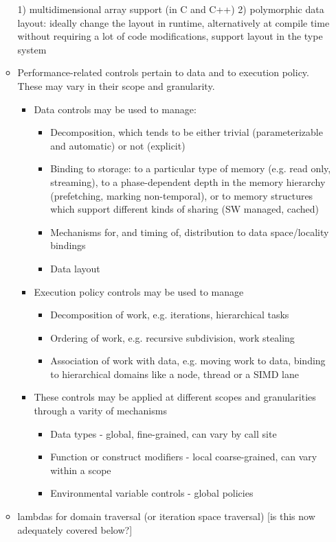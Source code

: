 \begin{itemize}
\begin{itemize}
    1) multidimensional array support (in C and C++) 
    2) polymorphic data layout: 
    ideally change the layout in runtime, 
    alternatively at compile time without requiring a lot of code modifications, 
    support layout in the type system 
  \item Performance-related controls pertain to data and to execution policy.  These may vary in their scope and granularity.
  \begin{itemize}
  \item Data controls may be used to manage:
  \begin{itemize} 
  \item Decomposition, which tends to be either trivial (parameterizable and automatic) or not (explicit)
  \item Binding to storage: to a particular type of memory (e.g. read only, streaming), to a phase-dependent depth in the memory hierarchy (prefetching, marking non-temporal), or to memory structures which support different kinds of sharing (SW managed, cached)
  \item Mechanisms for, and timing of, distribution to data space/locality bindings
  \item Data layout
  \end{itemize}
  \item Execution policy controls may be used to manage
  \begin{itemize} 
  \item Decomposition of work, e.g. iterations, hierarchical tasks
  \item Ordering of work, e.g. recursive subdivision, work stealing
  \item Association of work with data, e.g. moving work to data, binding to hierarchical domains like a node, thread or a SIMD lane
  \end{itemize}
  \item These controls may be applied at different scopes and granularities through a varity of mechanisms
  \begin{itemize} 
  \item Data types - global, fine-grained, can vary by call site
  \item Function or construct modifiers - local coarse-grained, can vary within a scope
  \item Environmental variable controls - global policies
  \end{itemize}
  \end{itemize}
  \item lambdas for domain traversal (or iteration space traversal) [is this now adequately covered below?]
  \end{itemize}
  

\end{itemize}
